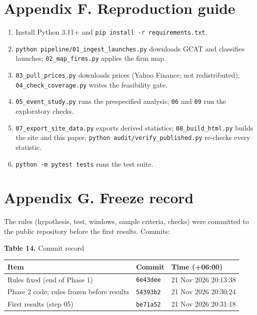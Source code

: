 \documentclass[12pt,a4paper]{article}
\begin{document}
\section*{Appendix F. Reproduction guide}
\begin{enumerate}[leftmargin=*,itemsep=2pt,topsep=4pt]
  \item Install Python 3.11+ and \texttt{pip install -r requirements.txt}.
  \item \texttt{python pipeline/01\_ingest\_launches.py} downloads GCAT and classifies launches; \texttt{02\_map\_firms.py} applies the firm map.
  \item \texttt{03\_pull\_prices.py} downloads prices (Yahoo Finance; not redistributed); \texttt{04\_check\_coverage.py} writes the feasibility gate.
  \item \texttt{05\_event\_study.py} runs the prespecified analysis; \texttt{06} and \texttt{09} run the exploratory checks.
  \item \texttt{07\_export\_site\_data.py} exports derived statistics; \texttt{08\_build\_html.py} builds the site and this paper; \texttt{python audit/verify\_published.py} re-checks every statistic.
  \item \texttt{python -m pytest tests} runs the test suite.
\end{enumerate}

\section*{Appendix G. Freeze record}
The rules (hypothesis, test, windows, sample criteria, checks) were committed to the public repository before the first results. Commits:

\par\noindent\begin{minipage}{\textwidth}
\textbf{Table 14.} Commit record

{\small\setlength{\tabcolsep}{4pt}\begin{tabularx}{\textwidth}{Xll}
\toprule
\textbf{Item} & \textbf{Commit} & \textbf{Time (+06:00)} \\
\midrule
Rules fixed (end of Phase 1) & \texttt{6e43dee} & 21 Nov 2026 20:13:38 \\
Phase 2 code; rules frozen before results & \texttt{54393b2} & 21 Nov 2026 20:30:24 \\
First results (step 05) & \texttt{be71a52} & 21 Nov 2026 20:31:18 \\
\bottomrule
\end{tabularx}}
\vspace{6pt}

\end{minipage}\par\vspace{4pt}
\end{document}
